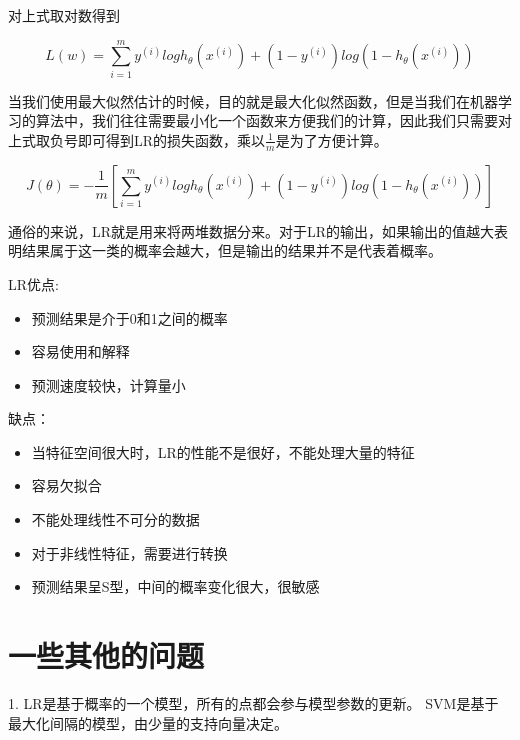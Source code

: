 	对上式取对数得到
	
	\begin{equation}
		L(w) = \sum_{i=1}^{m} y^{(i)} log h_\theta(x^{(i)})+ (1-y^{(i)})log(1-h_\theta(x^{(i)}))
	
	\end{equation}
	
	当我们使用最大似然估计的时候，目的就是最大化似然函数，但是当我们在机器学习的算法中，我们往往需要最小化一个函数来方便我们的计算，因此我们只需要对上式取负号即可得到LR的损失函数，乘以$\frac{1}{m}$是为了方便计算。
	
	\begin{equation}
		J(\theta) = - \frac{1}{m} \left[ \sum_{i=1}^{m} y^{(i)} log h_\theta(x^{(i)})+ (1-y^{(i)})log(1-h_\theta(x^{(i)})) \right]	
	
	\end{equation}
	
	通俗的来说，LR就是用来将两堆数据分来。对于LR的输出，如果输出的值越大表明结果属于这一类的概率会越大，但是输出的结果并不是代表着概率。
	
	LR优点:
	
	\begin{itemize}
		\item 预测结果是介于0和1之间的概率
		\item 容易使用和解释
		\item 预测速度较快，计算量小
	\end{itemize}
	
	缺点：
	\begin{itemize}
		\item 当特征空间很大时，LR的性能不是很好，不能处理大量的特征
		\item 容易欠拟合
		\item 不能处理线性不可分的数据
		\item 对于非线性特征，需要进行转换
		\item 预测结果呈S型，中间的概率变化很大，很敏感
	\end{itemize}


\section{一些其他的问题}
	1. LR是基于概率的一个模型，所有的点都会参与模型参数的更新。
	   SVM是基于最大化间隔的模型，由少量的支持向量决定。
	
	










